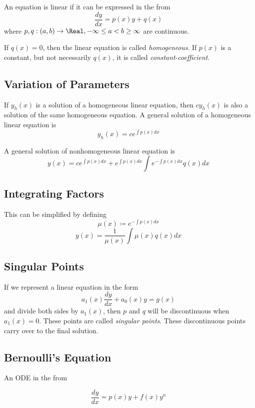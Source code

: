\begin{definition}
    An equation is linear if it can be expressed in the from
    \[
        \frac{dy}{dx} = p(x)y + q(x)
    \]
    where $p,q : (a,b) \rightarrow \Real, -\infty \le a < b \ge \infty$ are continuous.
\end{definition}

If $q(x) = 0$, then the linear equation is called \textit{homogeneous}. If $p(x)$ is a constant, but not necessarily $q(x)$, it is called \textit{constant-coefficient}.

\subsection{Variation of Parameters}

If $y_h(x)$ is a solution of a homogeneous linear equation, then $cy_h(x)$ is also a solution of the same homogeneous equation. A general solution of a homogeneous linear equation is
\[
    y_h(x) = ce^{\int p(x)dx}
\]

A general solution of nonhomogeneous linear equation is
\[
    y(x) = ce^{\int p(x)dx} + e^{\int p(x)dx}\int e^{-\int p(x)dx}q(x)dx
\]

\subsection{Integrating Factors}

This can be simplified by defining
\[
    \mu(x) \coloneq e^{-\int p(x)dx}
\]
\[
    y(x) = \frac{1}{\mu(x)}\int \mu(x)q(x)dx
\]

\subsection{Singular Points}

If we represent a linear equation in the form
\[
    a_1(x)\frac{dy}{dx} + a_0(x)y = g(x)
\]
and divide both sides by $a_1(x)$, then $p$ and $q$ will be discontinuous when $a_1(x) = 0$. These points are called \textit{singular points}. These discontinuous points carry over to the final solution.

\subsection{Bernoulli's Equation}

An ODE in the from

\[
    \frac{dy}{dx} = p(x)y + f(x)y^n
\]

